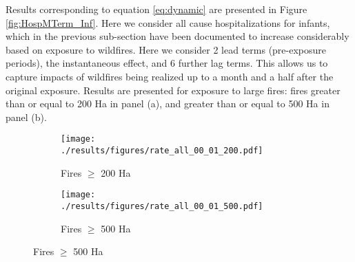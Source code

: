 \documentclass[11pt]{article}
\begin{document}
\begin{spacing}{1.5}
Results corresponding to equation \ref{eq:dynamic} are presented in Figure \ref{fig:HospMTerm_Inf}.  Here we consider all cause hospitalizations for infants, which in the previous sub-section have been documented to increase considerably based on exposure to wildfires.  Here we consider 2 lead terms (pre-exposure periods), the instantaneous effect, and 6 further lag terms.  This allows us to capture impacts of wildfires being realized up to a month and a half after the original exposure.   Results are presented for exposure to large fires: fires greater than or equal to 200 Ha in
panel (a), and greater than or equal to 500 Ha in panel (b). 


\begin{figure}[htpb!]
    \caption{Dynamic Impacts of Upwind Fires on Infants' Hospitalizations for All Causes}   
    \label{fig:HospMTerm_Inf}
    \begin{subfigure}{0.49\textwidth}
    \centering
    \texttt{[image: ./results/figures/rate\_all\_00\_01\_200.pdf]}
    \caption{Fires $\geq$ 200 Ha}
    \end{subfigure}    
    \begin{subfigure}{0.49\textwidth}
    \centering
     \texttt{[image: ./results/figures/rate\_all\_00\_01\_500.pdf]}
     \caption{Fires $\geq$ 500 Ha}
     \end{subfigure}    
\end{figure}


\end{spacing}
\end{document}

